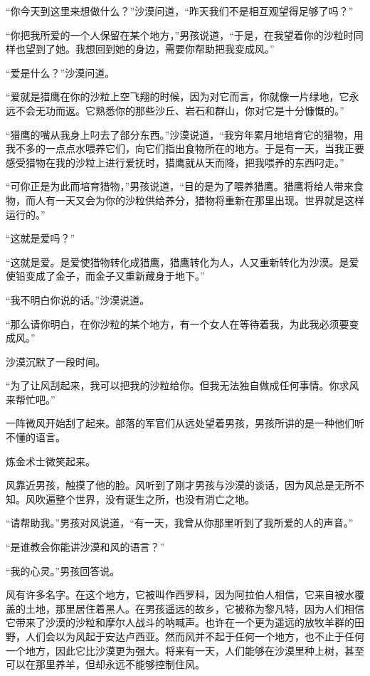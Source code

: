 \documentclass[twoside,openany]{book}
\begin{document}
“你今天到这里来想做什么？”沙漠问道，“昨天我们不是相互观望得足够了吗？”

“你把我所爱的一个人保留在某个地方，”男孩说道，“于是，在我望着你的沙粒时同样也望到了她。我想回到她的身边，需要你帮助把我变成风。”

“爱是什么？”沙漠问道。

“爱就是猎鹰在你的沙粒上空飞翔的时候，因为对它而言，你就像一片绿地，它永远不会无功而返。它熟悉你的那些沙丘、岩石和群山，你对它是十分慷慨的。”

“猎鹰的嘴从我身上叼去了部分东西。”沙漠说道，“我穷年累月地培育它的猎物，用我不多的一点点水喂养它们，向它们指出食物所在的地方。于是有一天，当我正要感受猎物在我的沙粒上进行爱抚时，猎鹰就从天而降，把我喂养的东西叼走。”

“可你正是为此而培育猎物，”男孩说道，“目的是为了喂养猎鹰。猎鹰将给人带来食物，而人有一天又会为你的沙粒供给养分，猎物将重新在那里出现。世界就是这样运行的。”

“这就是爱吗？”

“这就是爱。是爱使猎物转化成猎鹰，猎鹰转化为人，人又重新转化为沙漠。是爱使铅变成了金子，而金子又重新藏身于地下。”

“我不明白你说的话。”沙漠说道。

“那么请你明白，在你沙粒的某个地方，有一个女人在等待着我，为此我必须要变成风。”

沙漠沉默了一段时间。

“为了让风刮起来，我可以把我的沙粒给你。但我无法独自做成任何事情。你求风来帮忙吧。”

一阵微风开始刮了起来。部落的军官们从远处望着男孩，男孩所讲的是一种他们听不懂的语言。

炼金术士微笑起来。

风靠近男孩，触摸了他的脸。风听到了刚才男孩与沙漠的谈话，因为风总是无所不知。风吹遍整个世界，没有诞生之所，也没有消亡之地。

“请帮助我。”男孩对风说道，“有一天，我曾从你那里听到了我所爱的人的声音。”

“是谁教会你能讲沙漠和风的语言？”

“我的心灵。”男孩回答说。

风有许多名字。在这个地方，它被叫作西罗科，因为阿拉伯人相信，它来自被水覆盖的土地，那里居住着黑人。在男孩遥远的故乡，它被称为黎凡特，因为人们相信它带来了沙漠的沙粒和摩尔人战斗的呐喊声。也许在一个更为遥远的放牧羊群的田野，人们会以为风起于安达卢西亚。然而风并不起于任何一个地方，也不止于任何一个地方，因此它比沙漠更为强大。将来有一天，人们能够在沙漠里种上树，甚至可以在那里养羊，但却永远不能够控制住风。
\end{document}
